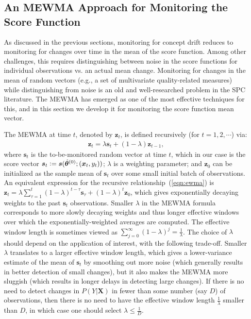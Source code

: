 \documentclass[twoside,11pt]{article}
\begin{document}
\subsection{An MEWMA Approach for Monitoring the Score Function}
\label{ss:MEWMA}
As discussed in the previous sections, monitoring for concept drift reduces to monitoring for changes over time in the mean of the score function. Among other challenges, this requires distinguishing between noise in the score functions for individual observations vs. an actual mean change. Monitoring for changes in the mean of random vectors (e.g., a set of multivariate quality-related measures) while distinguishing from noise is an old and well-researched problem in the SPC literature. The MEWMA has emerged as one of the most effective techniques for this, and in this section we develop it for monitoring the score function mean vector.

The MEWMA at time $t$, denoted by $\bm{z}_t$, is defined recursively (for $t=1,2,\cdots$) via:
\begin{align}
\bm {z}_t = \lambda \bm {s}_t + (1 - \lambda) \bm {z} _{t-1},
\label{eqn:ewma}
\end{align}
where $\bm {s}_t$ is the to-be-monitored random vector at time $t$, which in our case is the score vector $\bm {s}_t \vcentcolon= \bm{s}(\hat{\bm { \theta}}^{(0)};(\bm {x}_t, y_t))$; $ \lambda$ is a weighting parameter; and $\bm{z}_0$ can be initialized as the sample mean of $\bm {s}_t$ over some small initial batch of observations. An equivalent expression for the recursive relationship~(\ref{eqn:ewma}) is $\bm {z}_t = \lambda\sum _{\tau=1}^t (1-\lambda) ^{t-\tau} \bm{s} _{\tau} + (1-\lambda)^t \bm{z}_0$, which gives exponentially decaying weights to the past $\bm{s}_t$ observations. Smaller $\lambda$ in the MEWMA formula corresponds to more slowly decaying weights and thus longer effective windows over which the exponentially-weighted averages are computed. The effective window length is sometimes viewed as $\sum _{j=0}^\infty (1-\lambda)^j = \frac{1}{\lambda}$. The choice of $\lambda$ should depend on the application of interest, with the following trade-off. Smaller $\lambda$ translates to a larger effective window length, which gives a lower-variance estimate of the mean of $\bm{s}_t$ by smoothing out more noise (which generally results in better detection of small changes), but it also makes the MEWMA more sluggish (which results in longer delays in detecting large changes). If there is no need to detect changes in $P(Y|\bm{X})$ in fewer than some number (say $D$) of observations, then there is no need to have the effective window length $\frac{1}{\lambda}$ smaller than $D$, in which case one should  select $\lambda \leq \frac{1}{D}$.
\end{document}
